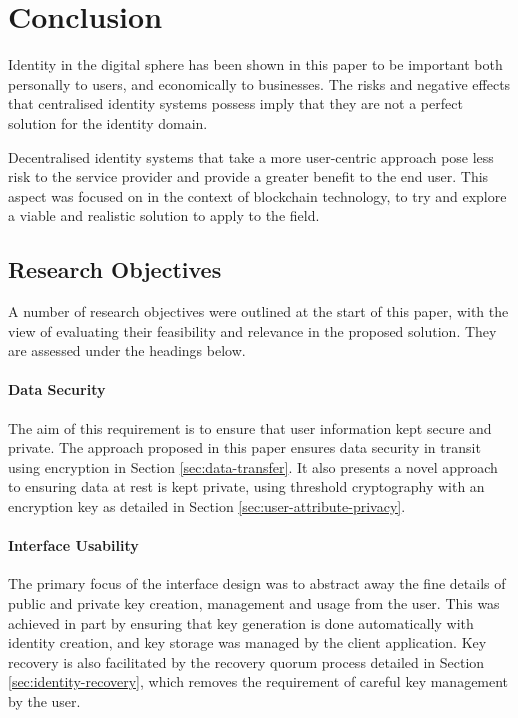 \chapter{Conclusion}
Identity in the digital sphere has been shown in this paper to be important both personally to users, and economically to businesses. The risks and negative effects that centralised identity systems possess imply that they are not a perfect solution for the identity domain.

Decentralised identity systems that take a more user-centric approach pose less risk to the service provider and provide a greater benefit to the end user. This aspect was focused on in the context of blockchain technology, to try and explore a viable and realistic solution to apply to the field.

\section{Research Objectives}
A number of research objectives were outlined at the start of this paper, with the view of evaluating their feasibility and relevance in the proposed solution. They are assessed under the headings below.

\subsubsection{Data Security}
The aim of this requirement is to ensure that user information kept secure and private. The approach proposed in this paper ensures data security in transit using encryption in Section \ref{sec:data-transfer}. It also presents a novel approach to ensuring data at rest is kept private, using threshold cryptography with an encryption key as detailed in Section \ref{sec:user-attribute-privacy}.

\subsubsection{Interface Usability}
The primary focus of the interface design was to abstract away the fine details of public and private key creation, management and usage from the user. This was achieved in part by ensuring that key generation is done automatically with identity creation, and key storage was managed by the client application. Key recovery is also facilitated by the recovery quorum process detailed in Section \ref{sec:identity-recovery}, which removes the requirement of careful key management by the user.

